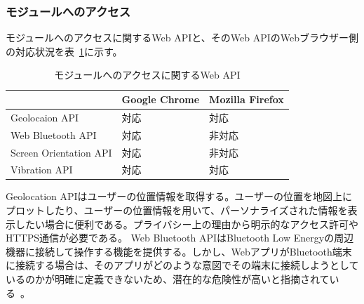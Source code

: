 \subsubsection{モジュールへのアクセス}\label{subsubsection:モジュールへのアクセス}
モジュールへのアクセスに関するWeb APIと、そのWeb APIのWebブラウザー側の対応状況を表~\ref{table:モジュールへのアクセスに関するWeb API}に示す。
\begin{table}
  \caption{モジュールへのアクセスに関するWeb API}\label{table:モジュールへのアクセスに関するWeb API}
  \centering
  \begin{tabular}{|p{20em}|p{10em}|p{10em}|}
    \hline
    & Google Chrome & Mozilla Firefox \\ \hline
    Geolocaion API & 対応 & 対応 \\ \hline
    Web Bluetooth API & 対応 & 非対応 \\ \hline
    Screen Orientation API & 対応 & 非対応 \\ \hline
    Vibration API & 対応 & 対応 \\ \hline
  \end{tabular}

\end{table}
Geolocation APIはユーザーの位置情報を取得する。ユーザーの位置を地図上にプロットしたり、ユーザーの位置情報を用いて、パーソナライズされた情報を表示したい場合に便利である。プライバシー上の理由から明示的なアクセス許可やHTTPS通信が必要である。
Web Bluetooth APIはBluetooth Low Energyの周辺機器に接続して操作する機能を提供する。しかし、WebアプリがBluetooth端末に接続する場合は、そのアプリがどのような意図でその端末に接続しようとしているのかが明確に定義できないため、潜在的な危険性が高いと指摘されている~\cite{MozillaWebBluetooth}。
